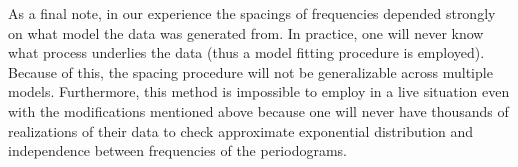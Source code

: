 \documentclass{article}\usepackage{graphicx, color}
\theoremstyle{plain}
\begin{document}
As a final note, in our experience the spacings of frequencies depended strongly on what model the data was generated from. In practice, one will never know what process underlies the data (thus a model fitting procedure is employed). Because of this, the spacing procedure will not be generalizable across multiple models. Furthermore, this method is impossible to employ in a live situation even with the modifications mentioned above because one will never have thousands of realizations of their data to check approximate exponential distribution and independence between frequencies of the periodograms.


\printbibliography
\end{document}
